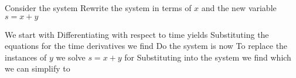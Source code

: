 
Consider the system 
Rewrite the system in terms of $x$ and the new variable $s=x+y$

\solution
We start with
Differentiating with respect to time yields
Substituting the equations for the time derivatives we find
Do the system is now
To replace the instances of $y$ we solve $s=x+y$ for 
Substituting into the system we find
which we can simplify to 
